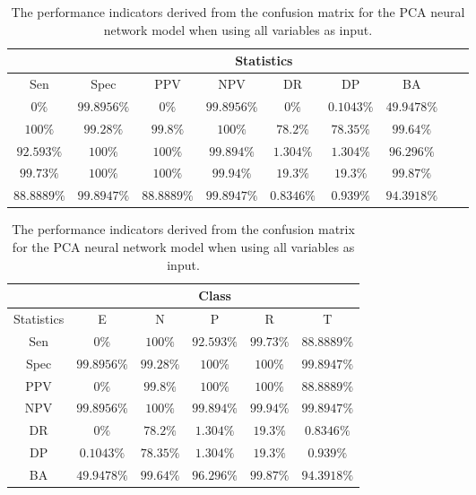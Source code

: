\begin{table}[!ht]
	\centering
	\begin{tabular}{|c|c|c|c|c|c|c|c|c|}
		\hline
		 & \multicolumn{7}{c|}{Statistics} \\ \hline
		Sen & Spec & PPV & NPV & DR & DP & BA \\ \hline
		$0\%$ & $99.8956\%$ & $0\%$ & $99.8956\%$ & $0\%$ & $0.1043\%$ & $49.9478\%$ \\ \hline
		$100\%$ & $99.28\%$ & $99.8\%$ & $100\%$ & $78.2\%$ & $78.35\%$ & $99.64\%$ \\ \hline
		$92.593\%$ & $100\%$ & $100\%$ & $99.894\%$ & $1.304\%$ & $1.304\%$ & $96.296\%$ \\ \hline
		$99.73\%$ & $100\%$ & $100\%$ & $99.94\%$ & $19.3\%$ & $19.3\%$ & $99.87\%$ \\ \hline
		$88.8889\%$ & $99.8947\%$ & $88.8889\%$ & $99.8947\%$ & $0.8346\%$ & $0.939\%$ & $94.3918\%$ \\ \hline
	\end{tabular}
	\caption{The performance indicators derived from the confusion matrix for the PCA neural network model when using all variables as input.}
	\label{tab:cs:all:pcaNNet}
\end{table}

\begin{table}[!ht]
	\centering
	\begin{tabular}{|c|c|c|c|c|c|}
		\hline
		 & \multicolumn{5}{c|}{Class} \\ \hline
		Statistics & E & N & P & R & T \\ \hline
		Sen & $0\%$ & $100\%$ & $92.593\%$ & $99.73\%$ & $88.8889\%$ \\ \hline
		Spec & $99.8956\%$ & $99.28\%$ & $100\%$ & $100\%$ & $99.8947\%$ \\ \hline
		PPV & $0\%$ & $99.8\%$ & $100\%$ & $100\%$ & $88.8889\%$ \\ \hline
		NPV & $99.8956\%$ & $100\%$ & $99.894\%$ & $99.94\%$ & $99.8947\%$ \\ \hline
		DR & $0\%$ & $78.2\%$ & $1.304\%$ & $19.3\%$ & $0.8346\%$ \\ \hline
		DP & $0.1043\%$ & $78.35\%$ & $1.304\%$ & $19.3\%$ & $0.939\%$ \\ \hline
		BA & $49.9478\%$ & $99.64\%$ & $96.296\%$ & $99.87\%$ & $94.3918\%$ \\ \hline
	\end{tabular}
	\caption{The performance indicators derived from the confusion matrix for the PCA neural network model when using all variables as input.}
	\label{tab:cs:reverse:all:pcaNNet}
\end{table}
